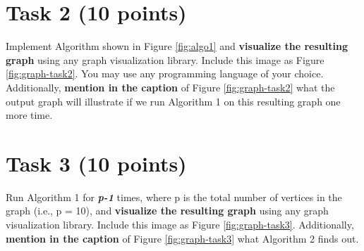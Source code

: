 \documentclass[a4paper]{article}
\begin{document}
\section*{Task 2 (10 points)}
Implement Algorithm shown in Figure \ref{fig:algo1} and \textbf{visualize the resulting graph} using any graph visualization library. Include this image as Figure \ref{fig:graph-task2}. You may use any programming language of your choice. Additionally, \textbf{mention in the caption} of Figure \ref{fig:graph-task2} what the output graph will illustrate if we run Algorithm 1 on this resulting graph one more time.

\section*{Task 3 (10 points)}
Run Algorithm 1 for \textbf{\textit{p-1}} times, where p is the total number of vertices in the graph (i.e., p = 10), and \textbf{visualize the resulting graph} using any graph visualization library. Include this image as Figure \ref{fig:graph-task3}. Additionally, \textbf{mention in the caption} of Figure \ref{fig:graph-task3} what Algorithm 2 finds out.
\end{document}
